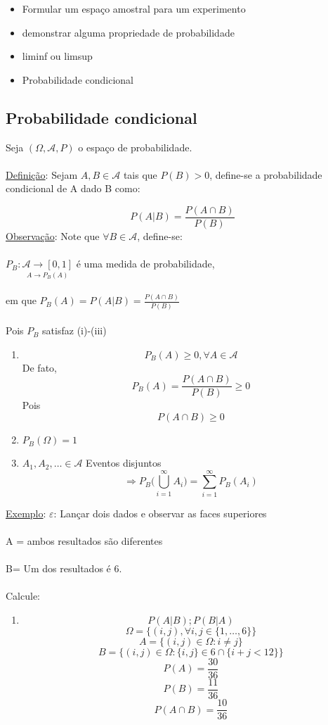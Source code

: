 \documentclass[a4paper,12pt]{article}
\begin{document}
\begin{itemize}
	\item Formular um espaço amostral para um experimento
	\item demonstrar alguma propriedade de probabilidade
	\item liminf ou limsup
	\item Probabilidade condicional
\end{itemize}
	\subsection{Probabilidade condicional}
	
	Seja $(\Omega,\mathscr{A},P)$ o espaço de probabilidade.\\
	\\
	\underline{Definição}: Sejam $A,B\in \mathscr{A}$ tais que $P(B)>0$, define-se a probabilidade condicional de A dado B como:
	
	$$P(A|B)=\frac{P(A\cap B)}{P(B)} $$
	\underline{Observação}:
	Note que $\forall B\in \mathscr{A}$, define-se:\\
	\\
	$P_B:\underset{A\longrightarrow P_B(A)}{\mathscr{A}\longrightarrow[0,1] }$ é uma medida de probabilidade,\\
	\\
	em que $P_B(A) = P(A|B)= \frac{P(A\cap B)}{P(B)}$ \\
	\\
	Pois $P_B$ satisfaz (i)-(iii)
	
	\begin{enumerate}[label=(\roman*)]
		\item $$P_B(A)\ge 0, \forall A\in \mathscr{A} $$
		De fato,
		$$P_B(A)=\frac{P(A\cap B)}{P(B)}\ge 0 $$
		Pois
		$$P(A\cap B)\ge 0 $$
		
		\item $P_B(\Omega)=1 $
		
		\item $A_1,A_2,\ldots \in \mathscr{A} $ Eventos disjuntos
		$$\Rightarrow P_B\bigg( \bigcup\limits_{i=1}^\infty A_i \bigg) = \sum\limits_{i=1}^{\infty} P_B(A_i) $$
	\end{enumerate}

\newpage
\underline{Exemplo}:
$\varepsilon $: Lançar dois dados e observar as faces superiores\\
\\
A = ambos resultados são diferentes\\
\\
B= Um dos resultados é 6. \\
\\
Calcule:\\
\begin{enumerate}[label=\roman*)]
	\item $$P(A|B); P(B|A) $$
	$$\Omega=\bigg\{(i,j),\forall i,j\in \{1,\ldots,6\}\bigg\} $$
	$$A=\{(i,j)\in \Omega: i\ne j \} $$
	$$B=\{(i,j)\in \Omega: \{i,j\}\in {6}\cap \{i+j<12\} \} $$
	$$P(A)=\frac{30}{36} $$
	$$P(B)=\frac{11}{36} $$
	$$P(A\cap B)=\frac{10}{36} $$
\end{enumerate}
\end{document}

